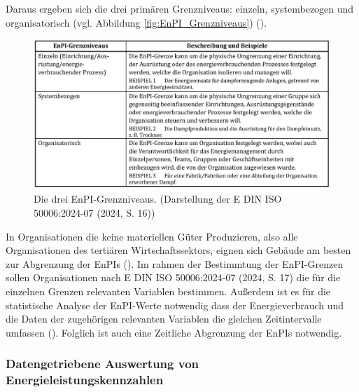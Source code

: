 Daraus ergeben sich die drei primären Grenzniveaus: einzeln, systembezogen und organisatorisch (vgl. Abbildung \eqref{fig:EnPI_Grenzniveaus}) (\cite[Kapitel 5.3]{DIN50006.2024}). 
\begin{figure}[H]
    \centering
    \includegraphics[width=1\textwidth]{../../Ressourcen/Abbildungen/EnPI_Grenzniveaus_ISO_50006.jpg}
    \caption{Die drei EnPI-Grenzniveaus. (Darstellung der E DIN ISO 50006:2024-07 (2024, S. 16))}
    \label{fig:EnPI_Grenzniveaus}
\end{figure}
In Organisationen die keine materiellen Güter Produzieren, also alle Organisationen des tertiären Wirtschaftssektors, eignen sich Gebäude am besten zur 
Abgrenzung der EnPIs (\cite[S. 9]{Fichera.2020}). 
Im rahmen der Bestimmtung der EnPI-Grenzen sollen Organisationen nach E DIN ISO 50006:2024-07 (2024, S. 17) die für die einzelnen Grenzen relevanten Variablen 
bestimmen.
Außerdem ist es für die statistische Analyse der EnPI-Werte notwendig dass der Energieverbrauch und die Daten der zugehörigen relevanten Variablen 
die gleichen Zeitintervalle umfassen (\cite[S. 20]{DIN50006.2024}).
Folglich ist auch eine Zeitliche Abgrenzung der EnPIs notwendig.

\subsubsection{Datengetriebene Auswertung von Energieleistungskennzahlen}